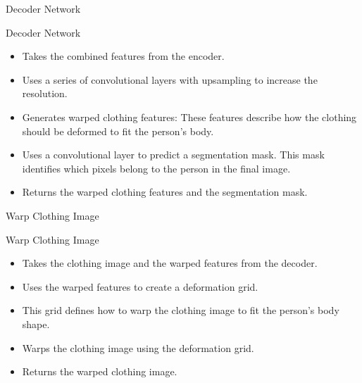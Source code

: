 \begin{algorithm}[H]
  \SetAlgoLined


  \caption{Decoder Network}
  \label{alg:decoder}
  \BlankLine

\end{algorithm}
\BlankLine
Decoder Network
\BlankLine
\begin{itemize}
    \item Takes the combined features from the encoder.
    \item Uses a series of convolutional layers with upsampling to increase the resolution.
    \item Generates warped clothing features: These features describe how the clothing should be deformed to fit the person's body.
    \item Uses a convolutional layer to predict a segmentation mask. This mask identifies which pixels belong to the person in the final image.
    \item Returns the warped clothing features and the segmentation mask.
\end{itemize}
\BlankLine
\begin{algorithm}[H]
  \SetAlgoLined


  \caption{Warp Clothing Image}
  \label{alg:warp_image}
  \BlankLine

\end{algorithm}
\BlankLine
Warp Clothing Image
\BlankLine
\begin{itemize}
    \item Takes the clothing image and the warped features from the decoder.
    \item Uses the warped features to create a deformation grid.
    \item This grid defines how to warp the clothing image to fit the person's body shape.
    \item Warps the clothing image using the deformation grid.
    \item Returns the warped clothing image.
\end{itemize}
\BlankLine

